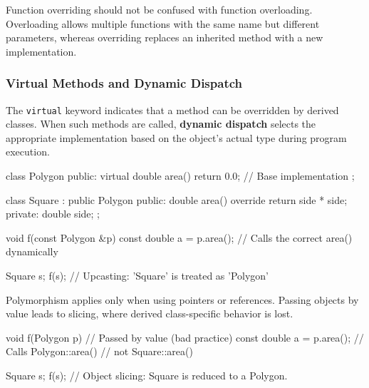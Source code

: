 \vspace{-0.7em}

\begin{tipsblock}
    Function overriding should not be confused with function overloading. Overloading allows multiple functions with the same name but different parameters, whereas overriding replaces an inherited method with a new implementation.
\end{tipsblock}

\vspace{-1em}

\subsubsection{Virtual Methods and Dynamic Dispatch}

\vspace{-0.5em}

The \texttt{virtual} keyword indicates that a method can be overridden by derived classes. When such methods are called, \textbf{dynamic dispatch} selects the appropriate implementation based on the object's actual type during program execution.

\vspace{-0.5em}

\begin{codeblock}[language=C++]
class Polygon {
public:
    virtual double area() { return 0.0; } // Base implementation
};

class Square : public Polygon {
public:
    double area() override { return side * side; }
private:
    double side;
};

void f(const Polygon &p) {
    const double a = p.area(); // Calls the correct area() dynamically
}

Square s;
f(s); // Upcasting: 'Square' is treated as 'Polygon'
\end{codeblock}

\vspace{-0.5em}

\begin{warningblock}
    Polymorphism applies only when using pointers or references.  
    Passing objects by value leads to slicing, where derived class-specific behavior is lost.
\end{warningblock}

\begin{codeblock}[language=C++, numbers=none]
void f(Polygon p) { // Passed by value (bad practice)
    const double a = p.area(); // Calls Polygon::area()
                               // not Square::area()
}

Square s;
f(s); // Object slicing: Square is reduced to a Polygon.
\end{codeblock}

